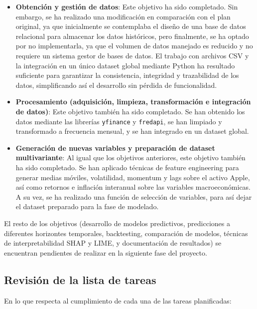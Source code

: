 \begin{itemize}
    \item \textbf{Obtención y gestión de datos}: Este objetivo ha sido completado. Sin embargo, se ha realizado una modificación en comparación con el plan original, ya que inicialmente se contemplaba el diseño de una base de datos relacional para almacenar los datos históricos, pero finalmente, se ha optado por no implementarla, ya que el volumen de datos manejado es reducido y no requiere un sistema gestor de bases de datos. El trabajo con archivos CSV y la integración en un único dataset global mediante Python ha resultado suficiente para garantizar la consistencia, integridad y trazabilidad de los datos, simplificando así el desarrollo sin pérdida de funcionalidad.
    
    \item \textbf{Procesamiento (adquisición, limpieza, transformación e integración de datos)}: Este objetivo también ha sido completado. Se han obtenido los datos mediante las librerías \texttt{yfinance} y \texttt{fredapi}, se han limpiado y transformado a frecuencia mensual, y se han integrado en un dataset global.
    
    \item \textbf{Generación de nuevas variables y preparación de dataset multivariante}: Al igual que los objetivos anteriores, este objetivo también ha sido completado. Se han aplicado técnicas de feature engineering para generar medias móviles, volatilidad, momentum y lags sobre el activo Apple, así como retornos e inflación interanual sobre las variables macroeconómicas. A su vez, se ha realizado una función de selección de variables, para así dejar el dataset preparado para la fase de modelado.
\end{itemize}

El resto de los objetivos (desarrollo de modelos predictivos, predicciones a diferentes horizontes temporales, backtesting, comparación de modelos, técnicas de interpretabilidad SHAP y LIME, y documentación de resultados) se encuentran pendientes de realizar en la siguiente fase del proyecto.

\subsection{Revisión de la lista de tareas}

En lo que respecta al cumplimiento de cada una de las tareas planificadas:

